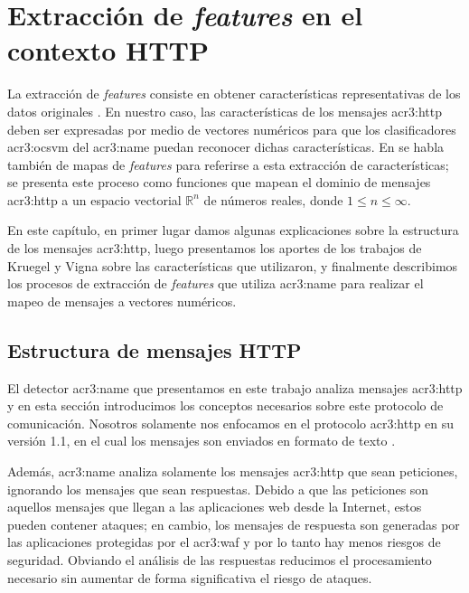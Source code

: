 \renewcommand{\newCommandChapterTitle}{Extracción de \textit{features} en el contexto HTTP}
\chapter{\newCommandChapterTitle}
\markright{\hfill \thechapter. \newCommandChapterTitle}
\label{chap:p3_concepts_features}


La extracción de \textit{features} consiste en obtener características
representativas de los datos originales
\citep{torranoGimenez2015study}. %
En nuestro caso, las características de los mensajes \gls{acr3:http} deben
ser expresadas por medio de vectores numéricos para que los clasificadores
\gls{acr3:ocsvm} del \gls{acr3:name} puedan reconocer dichas características.
En \citep{rieck2009machine} %
se habla también de mapas de \textit{features} para referirse a esta
extracción de características; se presenta este proceso como funciones
que mapean el dominio de mensajes \gls{acr3:http} a un espacio vectorial
$\mathbb{R}^{n}$ de números reales, donde $1 \leq n \leq \infty$.

En este capítulo, en primer lugar damos algunas explicaciones sobre
la estructura de los mensajes \gls{acr3:http}, luego presentamos los
aportes de los trabajos de Kruegel y Vigna sobre las características
que utilizaron, y finalmente describimos los procesos de extracción de
\textit{features} que utiliza \gls{acr3:name} para realizar el mapeo de
mensajes a vectores numéricos.


\section{Estructura de mensajes HTTP}

El detector \gls{acr3:name} que presentamos en este trabajo analiza
mensajes \gls{acr3:http} y en esta sección introducimos los conceptos
necesarios sobre este protocolo de comunicación.
Nosotros solamente nos enfocamos en el protocolo \gls{acr3:http} en su
versión 1.1, en el cual los mensajes son enviados en formato de texto
\citep{fielding1999http}. %

Además, \gls{acr3:name} analiza solamente los mensajes \gls{acr3:http}
que sean peticiones, ignorando los mensajes que sean respuestas. Debido
a que las peticiones son aquellos mensajes que llegan a las aplicaciones
web desde la Internet, estos pueden contener ataques; en cambio, los
mensajes de respuesta son generadas por las aplicaciones protegidas por
el \gls{acr3:waf} y por lo tanto hay menos riesgos de seguridad.
Obviando el análisis de las respuestas reducimos el procesamiento necesario
sin aumentar de forma significativa el riesgo de ataques.

